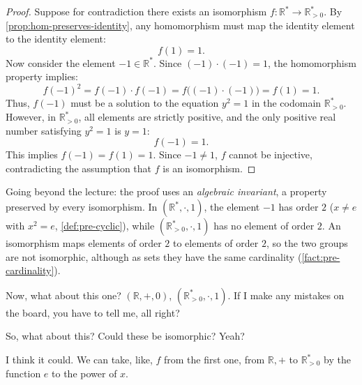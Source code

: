 \begin{content}
\begin{proof}
Suppose for contradiction there exists an isomorphism $f \colon \mathbb{R}^* \to \mathbb{R}^*_{>0}$.
By \cref{prop:hom-preserves-identity}, any homomorphism must map the identity element to the identity element:
\[
f(1) = 1.
\]
Now consider the element $-1 \in \mathbb{R}^*$. Since $(-1) \cdot (-1) = 1$, the homomorphism property implies:
\[
f(-1)^2 = f(-1) \cdot f(-1) = f\bigl((-1) \cdot (-1)\bigr) = f(1) = 1.
\]
Thus, $f(-1)$ must be a solution to the equation $y^2 = 1$ in the codomain $\mathbb{R}^*_{>0}$. However, in $\mathbb{R}^*_{>0}$, all elements are strictly positive, and the only positive real number satisfying $y^2 = 1$ is $y = 1$:
\[
f(-1) = 1.
\]
This implies $f(-1) = f(1) = 1$. Since $-1 \neq 1$, $f$ cannot be injective, contradicting the assumption that $f$ is an isomorphism.
\end{proof}

\begin{steps}
Going beyond the lecture: the proof uses an \emph{algebraic invariant}, a property preserved by every isomorphism. In $(\mathbb{R}^*, \cdot, 1)$, the element $-1$ has order $2$ ($x \neq e$ with $x^2 = e$, \cref{def:pre-cyclic}), while $(\mathbb{R}^*_{>0}, \cdot, 1)$ has no element of order $2$. An isomorphism maps elements of order $2$ to elements of order $2$, so the two groups are not isomorphic, although as sets they have the same cardinality (\cref{fact:pre-cardinality}).
\end{steps}
\end{content}

\begin{speech}[00:18:00 - 00:18:23]
Now, what about this one? 
$(\mathbb{R}, +, 0)$,
$(\mathbb{R}^*_{>0}, \cdot, 1)$.
If I make any mistakes on the board, you have to tell me, all right?

So, what about this? Could these be isomorphic? Yeah?
\end{speech}

\begin{student}
I think it could. We can take, like, $f$ from the first one, from $\mathbb{R}, +$ to $\mathbb{R}^*_{>0}$ by the function $e$ to the power of $x$.
\end{student}

